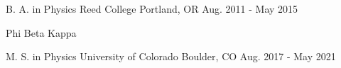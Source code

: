 

\begin{cventries}

  \cventry
    {B. A. in Physics} %
    {Reed College} %
    {Portland, OR} %
    {Aug. 2011 - May 2015} %
    {
      \begin{cvitems} %
        \item {Phi Beta Kappa}
      \end{cvitems}
    }

  \cventry
  {M. S. in Physics}
  {University of Colorado}
  {Boulder, CO}
  {Aug. 2017 - May 2021}
\end{cventries}
